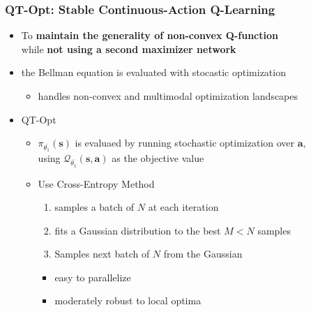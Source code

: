 \documentclass{beamer}
\renewcommand{\vec}[1]{\mathbf{#1}}
\newcommand{\forthSec}{QT-Opt}
\begin{document}
    \begin{frame}
      \frametitle{\forthSec : Stable Continuous-Action Q-Learning}
      \begin{itemize}
        \item To \textbf{maintain the generality of non-convex Q-function} \\ 
              while \textbf{not using a second maximizer network}
        \item the Bellman equation is evaluated with stocastic optimization
        \begin{itemize}
          \item handles non-convex and multimodal optimization landscapes
          \linebreak
        \end{itemize}
        \pause
        \item QT-Opt
        \begin{itemize}
          \item $\pi_{\bar{\theta_1}}(\vec{s})$ is evaluaed by running stochastic optimization over $\vec{a}$, \\
                using $\mathcal{Q}_{\bar{\theta_1}}(\vec{s}, \vec{a})$ as the objective value
          \pause
          \item Use Cross-Entropy Method
          \begin{enumerate}
            \item samples a batch of $N$ at each iteration
            \item fits a Gaussian distribution to the best $M < N$ samples
            \item Samples next batch of $N$ from the Gaussian
            \pause
          \end{enumerate}          
          \begin{itemize}
            \item easy to parallelize
            \item moderately robust to local optima
          \end{itemize}
        \end{itemize}
      \end{itemize}
    \end{frame}
\end{document}
